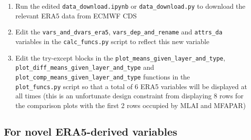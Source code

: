 \begin{itemize}
\begin{enumerate}
		\item Run the edited \verb+data_download.ipynb+ or \verb+data_download.py+ to download the relevant ERA5 data from ECMWF CDS
		\item Edit the \verb+vars_and_dvars_era5+, \verb+vars_dep_and_rename+ and \verb+attrs_da+ variables in the \verb+calc_funcs.py+ script to reflect this new variable
		\item Edit the try-except blocks in the \verb+plot_means_given_layer_and_type+, \verb+plot_diff_means_given_layer_and_type+ and \\ \verb+plot_comp_means_given_layer_and_type+ functions in the \\ \verb+plot_funcs.py+ script so that a total of 6 ERA5 variables will be displayed at all times (this is an unfortunate design constraint from displaying 8 rows for the comparison plots with the first 2 rows occupied by MLAI and MFAPAR)
	\end{enumerate}
\end{itemize}

\subsection{For novel ERA5-derived variables}

